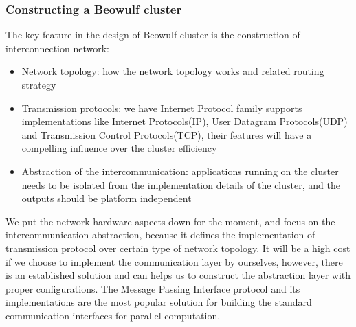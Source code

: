 \documentclass[11pt,openright,a4paper]{report}
\begin{document}
\subsubsection{Constructing a Beowulf cluster}
The key feature in the design of Beowulf cluster is the construction of interconnection network:
\begin{itemize}
	\item Network topology: how the network topology works and related routing strategy
	\item Transmission protocols: we have Internet Protocol family supports implementations like Internet Protocols(IP), User Datagram Protocols(UDP) and Transmission Control Protocols(TCP), their features will have a compelling influence over the cluster efficiency
	\item Abstraction of the intercommunication: applications running on the cluster needs to be isolated from the implementation details of the cluster, and the outputs should be platform independent
\end{itemize}
We put the network hardware aspects down for the moment, and focus on the intercommunication abstraction, because it defines the implementation of transmission protocol over certain type of network topology. It will be a high cost if we choose to implement the communication layer by ourselves, however, there is an established solution and can helps us to construct the abstraction layer with proper configurations. The Message Passing Interface protocol and its implementations are the most popular solution for building the standard communication interfaces for parallel computation\cite{geist1996mpi}.
\end{document}
